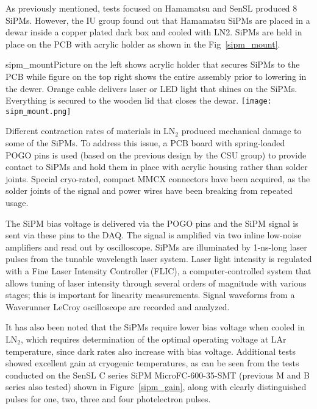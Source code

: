 As previously mentioned, tests focused on Hamamatsu and SenSL produced
8 SiPMs.  However, the IU group found out that Hamamatsu
SiPMs are placed in a dewar inside a copper plated dark box and cooled
with LN2. SiPMs are held in place on the PCB with acrylic holder as
shown in the Fig~\ref{sipm_mount}. 

\begin{cdrfigure}{sipm_mount}{Picture on the left shows acrylic holder that
    secures SiPMs to the PCB while figure on the top right shows the
    entire assembly prior to lowering in the dewer. Orange cable
    delivers laser or LED light that shines on the SiPMs. Everything
    is secured to the wooden lid that closes the dewar.}   
  \texttt{[image: sipm\_mount.png]}
\end{cdrfigure}

Different contraction rates of materials in
LN$_2$ produced mechanical damage to some of the SiPMs. To address this issue, a PCB board
with spring-loaded POGO pins is used (based on the previous design by
the CSU group) to provide contact to SiPMs and
hold them in place with acrylic housing rather than solder joints. Special cryo-rated, compact MMCX connectors have been acquired, as the
solder joints of the signal and power wires have been breaking from
repeated usage.

The SiPM bias voltage is delivered via the POGO pins and the SiPM signal is
sent via these pins to the DAQ. The signal is amplified via two inline
low-noise amplifiers and read out by oscilloscope. SiPMs are
illuminated by 1-ns-long laser pulses from the tunable wavelength
laser system. Laser light intensity is regulated with a Fine Laser
Intensity Controller (FLIC), a computer-controlled system that allows
tuning of laser intensity through several orders of magnitude with
various stages; this is important for linearity measurements. Signal waveforms
from a Waverunner LeCroy oscilloscope are recorded and analyzed.

It has also been noted that the SiPMs require lower bias voltage when
cooled in LN$_2$, which requires determination of the optimal operating
voltage at LAr temperature, since dark rates also increase with bias
voltage. Additional tests showed excellent gain at cryogenic
temperatures, as can be seen from the tests conducted on the SenSL C
series SiPM MicroFC-600-35-SMT (previous M and B series also tested) 
shown in Figure~\ref{sipm_gain}, along with clearly distinguished pulses
for one, two, three and four photelectron pulses.

